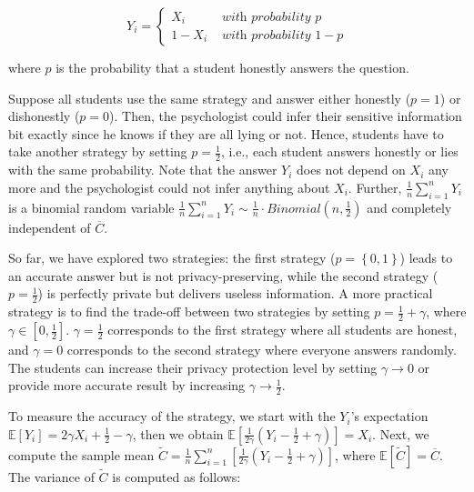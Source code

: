 \begin{equation}
    Y_{i}=
    \begin{cases}X_{i}   & \textit { with probability } p   \\
             1-X_{i} & \textit { with probability } 1-p
    \end{cases}
\end{equation}

where $p$ is the probability that a student honestly answers the question.

Suppose all students use the same strategy and answer either honestly ($p=1$) or dishonestly ($p=0$). Then, the psychologist could infer their sensitive information bit exactly since he knows if they are all lying or not. Hence, students have to take another strategy by setting $p=\frac{1}{2}$, i.e., each student answers honestly or lies with the same probability. Note that the answer $Y_{i}$ does not depend on $X_{i}$ any more and the psychologist could not infer anything about $X_{i}$. Further, $\frac{1}{n}\sum ^{n}_{i=1}Y_{i}$  is a binomial random variable $\frac{1}{n}\sum ^{n}_{i=1}Y_{i} \sim \frac{1}{n} \cdot Binomial\left(n,\frac{1}{2}\right)$ and completely independent of $\overline{C}$.

So far, we have explored two strategies: the first strategy ($p=\left\{0,1\right\} $) leads to an accurate answer but is not privacy-preserving, while the second strategy ($p=\frac{1}{2}$) is perfectly private but delivers useless information. A more practical strategy is to find the trade-off between two strategies by setting $p=\frac{1}{2}+\gamma$, where $\gamma \in \left[ 0 ,\frac{1}{2}\right] $. $\gamma=\frac{1}{2}$ corresponds to the first strategy where all students are honest, and $\gamma=0$ corresponds to the second strategy where everyone answers randomly. The students can increase their privacy protection level by setting $\gamma \to 0$ or provide more accurate result by increasing $\gamma \to \frac{1}{2}$.

To measure the accuracy of the strategy, we start with the $Y_{i}$’s expectation $\mathbb{E}\left[ Y_{i}\right] =2\gamma X_{i}+\frac{1}{2}-\gamma$, then we obtain $\mathbb{E} \left[ \frac{1}{2\gamma } \left(Y_{i}-\frac{1}{2}+\gamma \right) \right] =X_{i}$. Next, we compute the sample mean $\tilde{C}=\frac{1}{n}\sum ^{n}_{i=1}\left[ \frac{1}{2\gamma}\left( Y_{i}-\frac{1}{2}+\gamma \right) \right] $, where $\mathbb{E}\left[ \tilde{C}\right] =\overline{C}$. The variance of $\tilde{C}$ is computed as follows:

